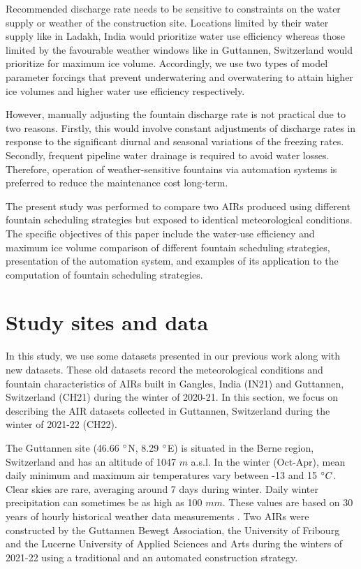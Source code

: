 \documentclass[tc, manuscript]{copernicus}
\begin{document}
Recommended discharge rate needs to be sensitive to constraints on the water supply or weather of the
construction site. Locations limited by their water supply like in Ladakh, India would prioritize water use
efficiency whereas those limited by the favourable weather windows like in Guttannen, Switzerland  would
prioritize for maximum ice volume.  Accordingly, we use two types of model parameter forcings that prevent
underwatering and overwatering to attain higher ice volumes and higher water use efficiency respectively. 

However, manually adjusting the fountain discharge rate is not practical due to two reasons. Firstly, this would
involve constant adjustments of discharge rates in response to the significant diurnal and seasonal variations
of the freezing rates. Secondly, frequent pipeline water drainage is required to avoid water losses. Therefore,
operation of weather-sensitive fountains via automation systems is preferred to reduce the maintenance cost
long-term.

The present study was performed to compare two AIRs produced using different fountain scheduling strategies but
exposed to identical meteorological conditions. The specific objectives of this paper include the water-use
efficiency and maximum ice volume comparison of different fountain scheduling strategies, presentation of the
automation system, and examples of its application to the computation of fountain scheduling strategies.

\section{Study sites and data}

In this study, we use some datasets presented in our previous work
\citep{balasubramanianInfluenceMeteorologicalConditions2022} along with new datasets. These old datasets record
the meteorological conditions and fountain characteristics of AIRs built in Gangles, India (IN21) and Guttannen,
Switzerland (CH21) during the winter of 2020-21. In this section, we focus on describing the AIR datasets
collected in Guttannen, Switzerland during the winter of 2021-22 (CH22).

The Guttannen site (46.66 $^{\circ}$N, 8.29 $^{\circ}$E) is situated in the Berne region, Switzerland and has an
altitude of 1047 $m$ a.s.l. In the winter (Oct-Apr), mean daily minimum and maximum air temperatures vary
between -13 and 15 $^{\circ} C$. Clear skies are rare, averaging around 7 days during winter. Daily winter
precipitation can sometimes be as high as 100 $mm$. These values are based on 30 years of hourly historical
weather data measurements \citep{meteoblueClimateGuttannen2021}. Two AIRs were constructed by the Guttannen
Bewegt Association, the University of Fribourg and the Lucerne University of Applied Sciences and Arts during
the winters of 2021-22 using a traditional and an automated construction strategy.
\end{document}
